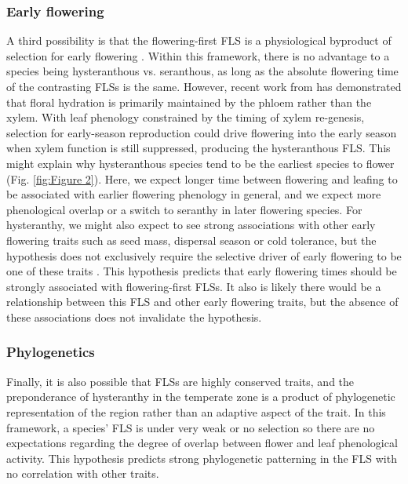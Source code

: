 \documentclass[12pt]{article}\usepackage[]{graphicx}\usepackage[]{color}
\begin{document}
\subsubsection*{Early flowering}
\indent\indent A third possibility is that the flowering-first FLS is a physiological byproduct of selection for early flowering \citep{Primack1987}. %
Within this framework, there is no advantage to a species being hysteranthous vs. seranthous, as long as the absolute flowering time of the contrasting FLSs is the same. %
However, recent work from \citet{Savage2019} has demonstrated that floral hydration is primarily maintained by the phloem rather than the xylem. With leaf phenology constrained by the timing of xylem re-genesis, selection for early-season reproduction could drive flowering into the early season when xylem function is still suppressed, producing the hysteranthous FLS. This might explain why hysteranthous species tend to be the earliest species to flower (Fig. \ref{fig:Figure 2}). Here, we expect longer time between flowering and leafing to be associated with earlier flowering phenology in general, and we expect more phenological overlap or a switch to seranthy in later flowering species. For hysteranthy, we might also expect to see strong associations with other early flowering traits such as seed mass, dispersal season or cold tolerance, but the hypothesis does not exclusively require the selective driver of early flowering to be one of these traits \citep{Savage2019}. This hypothesis predicts that early flowering times should be strongly associated with flowering-first FLSs. It also is likely there would be a relationship between this FLS and other early flowering traits, but the absence of these associations does not invalidate the hypothesis.
\subsubsection*{Phylogenetics} 
\indent\indent Finally, it is also possible that FLSs are highly conserved traits, and the preponderance of hysteranthy in the temperate zone is a product of phylogenetic representation of the region rather than an adaptive aspect of the trait. In this framework, a species' FLS is under very weak or no selection so there are no expectations regarding the degree of overlap between flower and leaf phenological activity.  This hypothesis predicts strong phylogenetic patterning in the FLS with no correlation with other traits.\\
\end{document}
